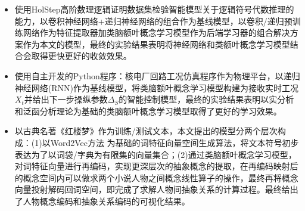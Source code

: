 \begin{itemize}

\item 使用HolStep高阶数理逻辑证明数据集检验智能模型关于逻辑符号代数推理的能力，以卷积神经网络+递归神经网络的组合作为基线模型，以卷积/递归预训练网络作为特征提取器加类脑额叶概念学习模型作为后端学习器的组合解决方案作为本文的模型，最终的实验结果表明将神经网络和类额叶概念学习模型结合会取得更快更好的收敛效果。

\item 使用自主开发的Python程序：核电厂回路工况仿真程序作为物理平台，以递归神经网络(RNN)作为基线模型，将类脑额叶概念学习模型构建为接收实时工况$X_t$并给出下一步操纵参数$\Delta_S$的智能控制模型，最终的实验结果表明以实分析和泛函分析理论为基础的类脑额叶概念学习模型取得了更好的学习效果。

\item 以古典名著《红楼梦》作为训练/测试文本，本文提出的模型分两个层次构成：(1)以Word2Vec方法 为基础的词特征向量空间生成算法，将文本符号初步表达为了以词袋/字典为有限集的向量集合；(2)通过类脑额叶概念学习模型，对词特征向量进行再编码，实现更深层次的抽象概念的提取，在再编码映射后的概念空间内可以做求两个小说人物之间概念线性算子的操作，最终再将概念向量投射解码回词空间，即完成了求解人物间抽象关系的计算过程。最终给出了人物概念编码和抽象关系编码的可视化结果。

\end{itemize}